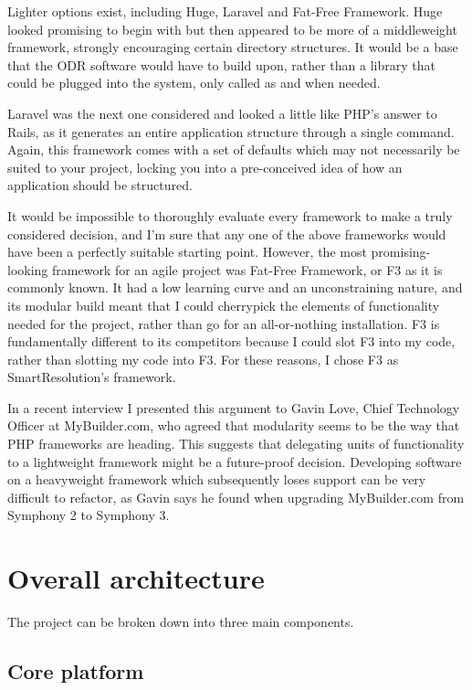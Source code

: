 Lighter options exist, including Huge, Laravel and Fat-Free Framework. Huge looked promising to begin with but then appeared to be more of a middleweight framework, strongly encouraging certain directory structures. It would be a base that the ODR software would have to build upon, rather than a library that could be plugged into the system, only called as and when needed.

Laravel was the next one considered and looked a little like PHP's answer to Rails, as it generates an entire application structure through a single command. Again, this framework comes with a set of defaults which may not necessarily be suited to your project, locking you into a pre-conceived idea of how an application should be structured.

It would be impossible to thoroughly evaluate every framework to make a truly considered decision, and I'm sure that any one of the above frameworks would have been a perfectly suitable starting point. However, the most promising-looking framework for an agile project was Fat-Free Framework, or F3 as it is commonly known. It had a low learning curve and an unconstraining nature, and its modular build meant that I could cherrypick the elements of functionality needed for the project, rather than go for an all-or-nothing installation. F3 is fundamentally different to its competitors because I could slot F3 into my code, rather than slotting my code into F3. For these reasons, I chose F3 as SmartResolution's framework.

In a recent interview I presented this argument to Gavin Love, Chief Technology Officer at MyBuilder.com, who agreed that modularity seems to be the way that PHP frameworks are heading. This suggests that delegating units of functionality to a lightweight framework might be a future-proof decision. Developing software on a heavyweight framework which subsequently loses support can be very difficult to refactor, as Gavin says he found when upgrading MyBuilder.com from Symphony 2 to Symphony 3.

\section{Overall architecture}

The project can be broken down into three main components.

\subsection{Core platform}

